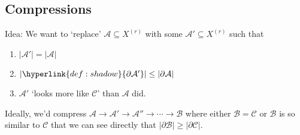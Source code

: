 \documentclass{article}
\let\subset\subseteq
\begin{document}
\subsection{Compressions}
Idea: We want to `replace' $\mathcal{A} \subset X^{(r)}$ with some $\mathcal{A}' \subset X^{(r)}$ such that
\begin{enumerate}[label=(\roman*)]
  \item $|\mathcal{A}'| = |\mathcal{A}|$
  \item $|\hyperlink{def:shadow}{\partial \mathcal{A}'}| \leq |\partial \mathcal{A}|$
  \item $\mathcal{A}'$ `looks more like $\mathcal{C}$' than $\mathcal{A}$ did.
\end{enumerate}
Ideally, we'd compress $\mathcal{A} \to \mathcal{A}' \to \mathcal{A}'' \to \dotsm \to \mathcal{B}$ where either $\mathcal{B} = \mathcal{C}$ or $\mathcal{B}$ is so similar to $\mathcal{C}$ that we can see directly that $|\partial \mathcal{B}| \geq |\partial \mathcal{C}|$.
\end{document}

